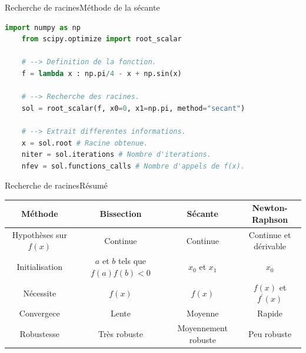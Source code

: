 \documentclass[usenames,dvipsnames,svgnames,10pt,aspectratio=169]{beamer}
\begin{document}
\begin{frame}[t, c, fragile]{Recherche de racines}{Méthode de la sécante}
  \begin{lstlisting}[language=Python]
    import numpy as np
    from scipy.optimize import root_scalar
    
    # --> Definition de la fonction.
    f = lambda x : np.pi/4 - x + np.sin(x)
    
    # --> Recherche des racines.
    sol = root_scalar(f, x0=0, x1=np.pi, method="secant")
    
    # --> Extrait differentes informations.
    x = sol.root # Racine obtenue.
    niter = sol.iterations # Nombre d'iterations.
    nfev = sol.functions_calls # Nombre d'appels de f(x).
  \end{lstlisting}
\end{frame}

\begin{frame}[t, c]{Recherche de racines}{Résumé}
  \centering
  \begin{tabular}{c|ccc}
    Méthode & Bissection & Sécante & Newton-Raphson \\
    \hline
    Hypothèses sur $f(x)$ & Continue & Continue & Continue et dérivable \\
    Initialisation & $a$ et $b$ tels que $f(a) f(b) < 0$ & $x_0$ et $x_1$ & $x_0$ \\
    Nécessite & $f(x)$ & $f(x)$ & $f(x)$ et $f^{\prime}(x)$ \\
    Convergece & {\color{red}Lente} & {\color{orange}Moyenne} & {\color{green} Rapide} \\
    Robustesse & {\color{green} Très robuste} & {\color{orange} Moyennement robuste} & {\color{red} Peu robuste}
  \end{tabular}

  \vspace{1cm}
\end{frame}
\end{document}
